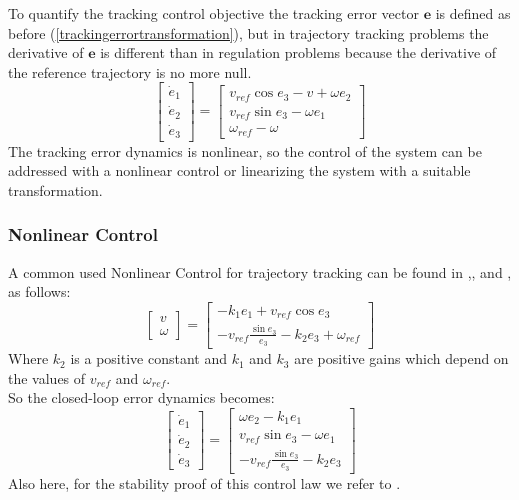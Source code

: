  To quantify the tracking control objective the tracking error vector $\mathbf{e}$ is defined as before (\ref{trackingerrortransformation}), but in trajectory tracking problems the derivative of $\mathbf{e}$ is different than in regulation problems because the derivative of the reference trajectory is no more null.
 \begin{equation}
 	\left[\begin{matrix}
 		\dot{e}_1\\\dot{e}_2\\\dot{e}_3
 	\end{matrix}\right] = 
 	\left[\begin{matrix}
	 	v_{ref}\cos e_3 - v+\omega e_2\\v_{ref}\sin e_3-\omega e_1\\\omega_{ref}-\omega
 	\end{matrix}\right]
 \end{equation}
 The tracking error dynamics is nonlinear, so the control of the system can be addressed with a nonlinear control or linearizing the system with a suitable transformation.
\subsubsection{Nonlinear Control}
A common used Nonlinear Control for trajectory tracking can be found in \cite{samsonCanudas},\cite{samson},\cite{dixon} and \cite{siciliano}, as follows:
\begin{equation}
	\left[\begin{matrix}
	v\\\omega
	\end{matrix}\right] = 
	\left[\begin{matrix}
	-k_1e_1+v_{ref}\cos e_3\\-v_{ref}\frac{\sin e_3}{e_3}-k_2e_3+\omega_{ref}
	\end{matrix}\right]
\end{equation}
Where $k_2$ is a positive constant and $k_1$ and $k_3$ are positive gains which depend on the values of $v_{ref}$ and $\omega_{ref}$. \\ So the closed-loop error dynamics becomes:
 \begin{equation}
	\left[\begin{matrix}
	\dot{e}_1\\\dot{e}_2\\\dot{e}_3
	\end{matrix}\right] = 
	\left[\begin{matrix}
	\omega e_2-k_1e_1\\v_{ref}\sin e_3-\omega e_1\\-v_{ref}\frac{\sin e_3}{e_3}-k_2e_3
	\end{matrix}\right]
\end{equation}
Also here, for the stability proof of this control law we refer to \cite{dixon}.
